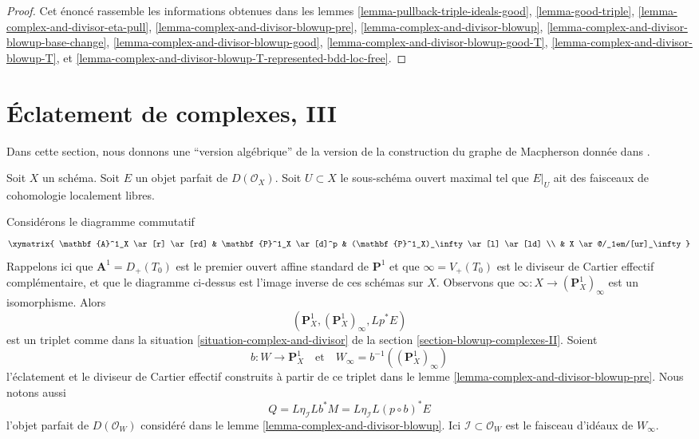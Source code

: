 \begin{proof}
Cet énoncé rassemble les informations obtenues dans les
lemmes \ref{lemma-pullback-triple-ideals-good},
\ref{lemma-good-triple},
\ref{lemma-complex-and-divisor-eta-pull},
\ref{lemma-complex-and-divisor-blowup-pre},
\ref{lemma-complex-and-divisor-blowup},
\ref{lemma-complex-and-divisor-blowup-base-change},
\ref{lemma-complex-and-divisor-blowup-good},
\ref{lemma-complex-and-divisor-blowup-good-T},
\ref{lemma-complex-and-divisor-blowup-T}, et
\ref{lemma-complex-and-divisor-blowup-T-represented-bdd-loc-free}.
\end{proof}










\section{Éclatement de complexes, III}
\label{section-blowup-complexes-III}

\noindent
Dans cette section, nous donnons une ``version algébrique'' de la version de la
construction du graphe de Macpherson donnée dans \cite[Section 18.1]{F}.

\medskip\noindent
Soit $X$ un schéma. Soit $E$ un objet parfait de $D(\mathcal{O}_X)$.
Soit $U \subset X$ le sous-schéma ouvert maximal tel que
$E|_U$ ait des faisceaux de cohomologie localement libres.

\medskip\noindent
Considérons le diagramme commutatif
$$
\xymatrix{
\mathbf{A}^1_X \ar[r] \ar[rd] &
\mathbf{P}^1_X \ar[d]^p &
(\mathbf{P}^1_X)_\infty \ar[l] \ar[ld] \\
& X \ar@/_1em/[ur]_\infty
}
$$
Rappelons ici que $\mathbf{A}^1 = D_+(T_0)$ est le premier ouvert
affine standard de $\mathbf{P}^1$ et que $\infty = V_+(T_0)$ est le
diviseur de Cartier effectif complémentaire, et que le diagramme ci-dessus
est l'image inverse de ces schémas sur $X$. Observons que
$\infty : X \to (\mathbf{P}^1_X)_\infty$ est un isomorphisme.
Alors
$$
(\mathbf{P}^1_X, (\mathbf{P}^1_X)_\infty, Lp^*E)
$$
est un triplet comme dans la situation \ref{situation-complex-and-divisor}
de la section \ref{section-blowup-complexes-II}.
Soient
$$
b : W \longrightarrow \mathbf{P}^1_X\quad\text{et}\quad
W_\infty = b^{-1}((\mathbf{P}^1_X)_\infty)
$$
l'éclatement et le diviseur de Cartier effectif construits
à partir de ce triplet dans le
lemme \ref{lemma-complex-and-divisor-blowup-pre}.
Nous notons aussi
$$
Q = L\eta_{\mathcal{I}} Lb^*M = L\eta_\mathcal{I} L(p \circ b)^*E
$$
l'objet parfait de $D(\mathcal{O}_W)$
considéré dans le lemme \ref{lemma-complex-and-divisor-blowup}.
Ici $\mathcal{I} \subset \mathcal{O}_W$ est le faisceau d'idéaux
de $W_\infty$.

